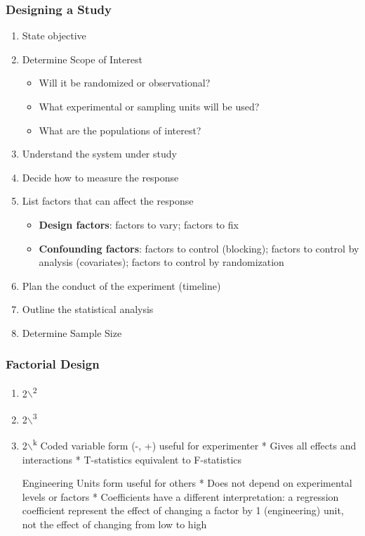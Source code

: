 \documentclass[11pt]{article}
\begin{document}
\subsubsection{Designing a Study}
\label{sec:org698801c}
\begin{enumerate}
\item State objective
\item Determine Scope of Interest

\begin{itemize}
\item Will it be randomized or observational?
\item What experimental or sampling units will be used?
\item What are the populations of interest?
\end{itemize}

\item Understand the system under study
\item Decide how to measure the response
\item List factors that can affect the response

\begin{itemize}
\item \textbf{Design factors}: factors to vary; factors to fix
\item \textbf{Confounding factors}: factors to control (blocking); factors to
control by analysis (covariates); factors to control by
randomization
\end{itemize}

\item Plan the conduct of the experiment (timeline)
\item Outline the statistical analysis
\item Determine Sample Size
\end{enumerate}

\subsubsection{Factorial Design}
\label{sec:orgffe9694}
\begin{enumerate}
\item 2$\backslash$\textsuperscript{2}
\label{sec:org3e655ec}

\item 2$\backslash$\textsuperscript{3}
\label{sec:org668dcac}

\item 2$\backslash$\textsuperscript{k}
\label{sec:org91208cd}
Coded variable form (-, +) useful for experimenter * Gives all effects
and interactions * T-statistics equivalent to F-statistics

Engineering Units form useful for others * Does not depend on
experimental levels or factors * Coefficients have a different
interpretation: a regression coefficient represent the effect of
changing a factor by 1 (engineering) unit, not the effect of changing
from low to high
\end{enumerate}
\end{document}
